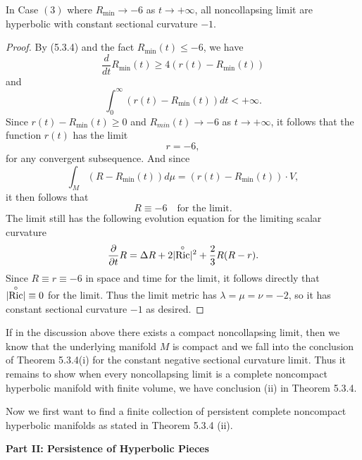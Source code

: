 \begin{lemma} 
  \label{lem:cz-noncollapsing-limits-hyperbolic}

In Case $(3)$ where $R_{\min}\rightarrow-6$ as $t\rightarrow
+\infty$, all noncollapsing limit are hyperbolic with constant
sectional curvature $-1.$
\end{lemma}

\begin{proof}
By (5.3.4) and the fact $R_{\min}(t)\le-6$, we have
$$
\frac{d}{dt}R_{\min}(t)\ge 4(r(t)-R_{\min}(t))
$$
and
$$
\int_0^\infty(r(t)-R_{\min}(t))dt<+\infty.
$$
Since $r(t)-R_{\min}(t)\ge 0$ and $R_{min}(t)\rightarrow-6$ as
$t\rightarrow+\infty$, it follows that the function $r(t)$ has the
limit
$$
r=-6,
$$
for any convergent subsequence. And since
$$
\int_M(R-R_{\min}(t))d\mu=(r(t)-R_{\min}(t))\cdot V,
$$
it then follows that
$$
R\equiv-6\quad \text{for the limit}.
$$
The limit still has the following evolution equation for the
limiting scalar curvature
$$
\frac{\partial}{\partial t}R=\Delta R+2| {\mathop {\rm
Ric}\limits^\circ}|^2+\frac{2}{3}R(R-r).
$$
Since $R\equiv r\equiv -6$ in space and time for the limit, it
follows directly that $|{\mathop {\rm Ric}\limits^ \circ}|\equiv
0$ for the limit. Thus the limit metric has $\lambda=\mu=\nu=-2$,
so it has constant sectional curvature $-1$ as desired.
\end{proof}

If in the discussion above there exists a compact noncollapsing
limit, then we know that the underlying manifold $M$ is compact
and we fall into the conclusion of Theorem 5.3.4(i) for the
constant negative sectional curvature limit. Thus it remains to
show when every noncollapsing limit is a complete noncompact
hyperbolic manifold with finite volume, we have conclusion (ii) in
Theorem 5.3.4.

Now we first want to find a finite collection of persistent
complete noncompact hyperbolic manifolds as stated in Theorem
5.3.4 (ii).

\bigskip
{\bf Part II: Persistence of Hyperbolic Pieces}

